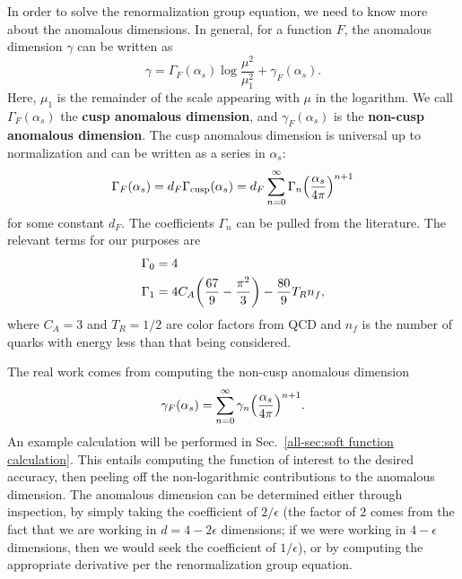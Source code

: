 \documentclass[../thesis.tex]{subfiles}
\providecommand{\cusp}{\mathrm{cusp}}
\begin{document}
	In order to solve the renormalization group equation, we need to know more about the anomalous dimensions. In general, for a function $F$, the anomalous dimension $\gamma$ can be written as \cite{frye_factorization_2016}
	\begin{equation}\label{all-eq:general anomalous dimension}
		\gamma = \Gamma_F(\alpha_s) \log\frac{\mu^2}{\mu_1^2} + \gamma_F(\alpha_s).
	\end{equation}
	Here, $\mu_1$ is the remainder of the scale appearing with $\mu$ in the logarithm. We call $\Gamma_F(\alpha_s)$ the \textbf{cusp anomalous dimension}, and $\gamma_F(\alpha_s)$ is the \textbf{non-cusp anomalous dimension}. The cusp anomalous dimension is universal up to normalization and can be written as a series in $\alpha_s$:
	\begin{equation}\label{all-eq:general cusp anomalous dimension}
		\Gamma_F(\alpha_s) = d_F \Gamma_\cusp(\alpha_s) = d_F \sum_{n = 0}^\infty \Gamma_n \qty(\frac{\alpha_s}{4\pi})^{n + 1}
	\end{equation}
	for some constant $d_F$. The coefficients $\Gamma_n$ can be pulled from the literature. The relevant terms for our purposes are \cite{frye_factorization_2016}
	\begin{equation}\label{all-eq:Gamma values}
	\begin{aligned}
		\Gamma_0 &= 4 \\
		\Gamma_1 &= 4C_A \qty(\frac{67}{9} - \frac{\pi^2}{3}) - \frac{80}{9}T_R n_f,
	\end{aligned}
	\end{equation}
	where $C_A = 3$ and $T_R = 1/2$ are color factors from QCD and $n_f$ is the number of quarks with energy less than that being considered.

	The real work comes from computing the non-cusp anomalous dimension
	\begin{equation}\label{all-eq:general non-cusp anomalous dimension}
		\gamma_F(\alpha_s) = \sum_{n = 0}^\infty \gamma_n \qty(\frac{\alpha_s}{4\pi})^{n + 1}.
	\end{equation}
	An example calculation will be performed in Sec.~\ref{all-sec:soft function calculation}. This entails computing the function of interest to the desired accuracy, then peeling off the non-logarithmic contributions to the anomalous dimension. The anomalous dimension can be determined either through inspection, by simply taking the coefficient of $2/\epsilon$ (the factor of $2$ comes from the fact that we are working in $d = 4 - 2\epsilon$ dimensions; if we were working in $4 - \epsilon$ dimensions, then we would seek the coefficient of $1/\epsilon$), or by computing the appropriate derivative per the renormalization group equation.
\end{document}
